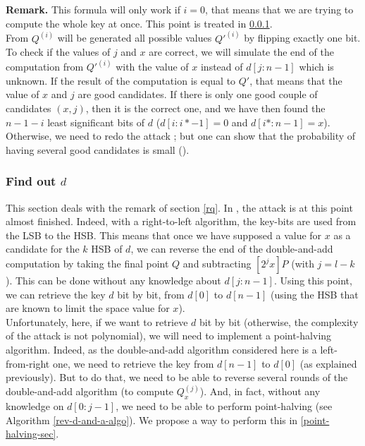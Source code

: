 \documentclass[journal]{IEEEtran}
\begin{document}
\label{rq}
{\bf Remark.} This formula will only work if $i = 0$, that means that we are trying to compute the whole key at once. This point is treated in \ref{difficulties}.\\


From $Q^{(i)}$ will be generated all possible values $Q'^{(i)}$ by flipping exactly one bit. To check if the values of $j$ and $x$ are correct, 
we will simulate the end of the computation from $Q'^{(i)}$ with the value of $x$ instead of $d[j:n-1]$ which is unknown. If the result of the computation
is equal to $Q'$, that means that the value of $x$ and $j$ are good candidates.
If there is only one good couple of candidates $(x, j)$, then it is the correct one, and we have then found the $n - 1 - i$ least significant bits of $d$ ($d[i:i*-1] = 0$ and $d[i*:n-1] = x$).
Otherwise, we need to redo the attack ; but one can show that the probability of having several good candidates is small 
(\cite{biehl2000differential}).\\

\subsubsection{Find out $d$}
\label{difficulties}
This section deals with the remark of section \ref{rq}.
In \cite{biehl2000differential}, the attack is at this point almost finished. Indeed, with a right-to-left algorithm, the key-bits are used from the LSB to the HSB. This means that 
once we have supposed a value for $x$ as a candidate for the $k$ HSB of $d$, we can reverse the end of the double-and-add computation by taking the final point 
$Q$ and subtracting $[2^{j}x]P$ (with $j = l - k$). This can be done without any knowledge about $d[j:n-1]$. Using this point, we can retrieve the key $d$ bit by bit, from $d[0]$ to 
$d[n-1]$ (using the HSB that are known to limit the space value for $x$).\\

Unfortunately, here, if we want to retrieve $d$ bit by bit (otherwise, the complexity of the attack is not polynomial), we will need to implement a point-halving algorithm. 
Indeed, as the double-and-add algorithm considered here is a left-from-right one, we need to retrieve the key from $d[n-1]$ to $d[0]$ (as explained previously). But to do that, we need
to be able to reverse several rounds of the double-and-add algorithm (to compute $Q_x^{(j)}$). And, in fact, without any knowledge on $d[0:j-1]$, we need to be able to perform point-halving
(see Algorithm \ref{rev-d-and-a-algo}). We propose a way to perform this in \ref{point-halving-sec}.
\end{document}
